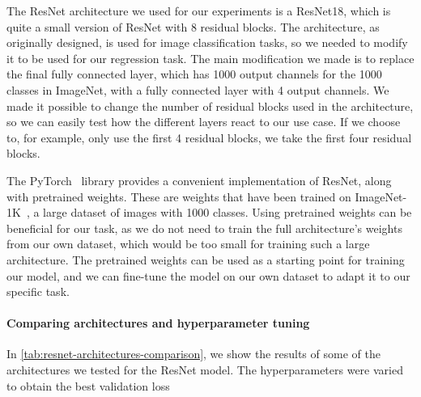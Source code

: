 The ResNet architecture we used for our experiments is a ResNet18, which is quite a small version of ResNet with 8 residual blocks.
The architecture, as originally designed, is used for image classification tasks, so we needed to modify it to be used for our regression task.
The main modification we made is to replace the final fully connected layer, which has 1000 output channels for the 1000 classes in ImageNet, with a fully connected layer with 4 output channels.
We made it possible to change the number of residual blocks used in the architecture, so we can easily test how the different layers react to our use case.
If we choose to, for example, only use the first 4 residual blocks, we take the first four residual blocks.

The PyTorch~\cite{src:pytorch} library provides a convenient implementation of ResNet, along with pretrained weights.
These are weights that have been trained on ImageNet-1K~\cite{src:imagenet}, a large dataset of images with 1000 classes.
Using pretrained weights can be beneficial for our task, as we do not need to train the full architecture's weights from our own dataset, which would be too small for training such a large architecture.
The pretrained weights can be used as a starting point for training our model, and we can fine-tune the model on our own dataset to adapt it to our specific task.

\paragraph{Comparing architectures and hyperparameter tuning}\label{ch:models-for-uncertainty-aware-object-detection_section:deep-ensembles_subsection:resnet_comparing-architectures-and-hyperparameter-tuning}
In \cref{tab:resnet-architectures-comparison}, we show the results of some of the architectures we tested for the ResNet model.
The hyperparameters were varied to obtain the best validation loss

